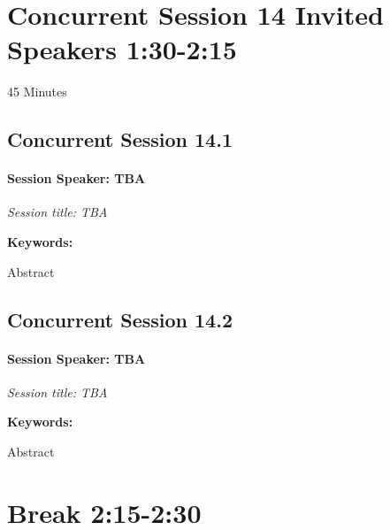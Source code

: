 \documentclass[
]{book}
\begin{document}
\hypertarget{concurrent-session-14-invited-speakers-130-215}{%
\section*{Concurrent Session 14 \textbar{} Invited Speakers \textbar{} 1:30-2:15}\label{concurrent-session-14-invited-speakers-130-215}}

45 Minutes

\hypertarget{concurrent-session-14.1}{%
\subsection*{Concurrent Session 14.1}\label{concurrent-session-14.1}}

\begin{speaker}
\hypertarget{session-speaker-tba}{%
\paragraph{\texorpdfstring{Session Speaker:
\textbf{TBA}}{Session Speaker: TBA}}\label{session-speaker-tba}}

\emph{Session title: TBA}

\textbf{Keywords:}

Abstract
\end{speaker}

\hypertarget{concurrent-session-14.2}{%
\subsection*{Concurrent Session 14.2}\label{concurrent-session-14.2}}

\begin{speaker}
\hypertarget{session-speaker-tba}{%
\paragraph{\texorpdfstring{Session Speaker:
\textbf{TBA}}{Session Speaker: TBA}}\label{session-speaker-tba}}

\emph{Session title: TBA}

\textbf{Keywords:}

Abstract
\end{speaker}

\hypertarget{break-215-230-1}{%
\section*{Break \textbar{} 2:15-2:30}\label{break-215-230-1}}
\end{document}
